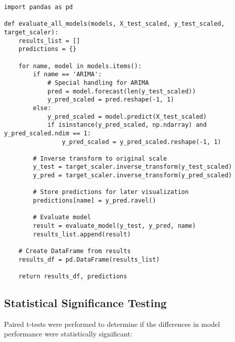 \documentclass[12pt]{article}
\begin{document}
\begin{verbatim}
import pandas as pd

def evaluate_all_models(models, X_test_scaled, y_test_scaled, target_scaler):
    results_list = []
    predictions = {}
    
    for name, model in models.items():
        if name == 'ARIMA':
            # Special handling for ARIMA
            pred = model.forecast(len(y_test_scaled))
            y_pred_scaled = pred.reshape(-1, 1)
        else:
            y_pred_scaled = model.predict(X_test_scaled)
            if isinstance(y_pred_scaled, np.ndarray) and y_pred_scaled.ndim == 1:
                y_pred_scaled = y_pred_scaled.reshape(-1, 1)
        
        # Inverse transform to original scale
        y_test = target_scaler.inverse_transform(y_test_scaled)
        y_pred = target_scaler.inverse_transform(y_pred_scaled)
        
        # Store predictions for later visualization
        predictions[name] = y_pred.ravel()
        
        # Evaluate model
        result = evaluate_model(y_test, y_pred, name)
        results_list.append(result)
    
    # Create DataFrame from results
    results_df = pd.DataFrame(results_list)
    
    return results_df, predictions
\end{verbatim}

\subsection{Statistical Significance Testing}
\label{subsec:significance_testing}

Paired t-tests were performed to determine if the differences in model performance were statistically significant:
\end{document}
